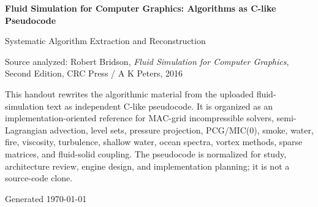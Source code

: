 \documentclass[10pt,letterpaper]{article}
\newcommand{\handouttitle}{Fluid Simulation for Computer Graphics: Algorithms as C-like Pseudocode}
\begin{document}
\begin{titlepage}
\centering
\vspace*{0.85in}
{\Huge\bfseries\color{HouseBlue}\handouttitle\par}
\vspace{0.22in}
{\Large Systematic Algorithm Extraction and Reconstruction\par}
\vspace{0.34in}
{\large Source analyzed: Robert Bridson, \emph{Fluid Simulation for Computer Graphics}, Second Edition, CRC Press / A K Peters, 2016\par}
\vfill
\begin{minipage}{0.88\textwidth}
\small
This handout rewrites the algorithmic material from the uploaded fluid-simulation text as independent C-like pseudocode. It is organized as an implementation-oriented reference for MAC-grid incompressible solvers, semi-Lagrangian advection, level sets, pressure projection, PCG/MIC(0), smoke, water, fire, viscosity, turbulence, shallow water, ocean spectra, vortex methods, sparse matrices, and fluid-solid coupling. The pseudocode is normalized for study, architecture review, engine design, and implementation planning; it is not a source-code clone.
\end{minipage}
\vfill
{\large Generated \today\par}
\end{titlepage}
\clearpage
{}
\tableofcontents
\clearpage
{}
\end{document}
